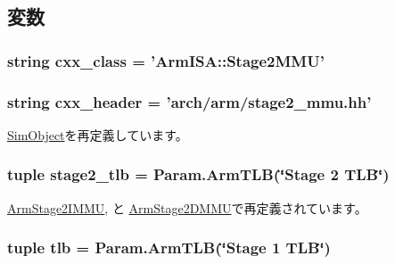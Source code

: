 \subsection{変数}
\hypertarget{classArmTLB_1_1ArmStage2MMU_a58cd55cd4023648e138237cfc0822ae3}{
\subsubsection[{cxx\_\-class}]{\setlength{\rightskip}{0pt plus 5cm}string {\bf cxx\_\-class} = '{\bf ArmISA::Stage2MMU}'}}
\label{classArmTLB_1_1ArmStage2MMU_a58cd55cd4023648e138237cfc0822ae3}
\hypertarget{classArmTLB_1_1ArmStage2MMU_a17da7064bc5c518791f0c891eff05fda}{
\subsubsection[{cxx\_\-header}]{\setlength{\rightskip}{0pt plus 5cm}string {\bf cxx\_\-header} = 'arch/arm/stage2\_\-mmu.hh'}}
\label{classArmTLB_1_1ArmStage2MMU_a17da7064bc5c518791f0c891eff05fda}


\hyperlink{classm5_1_1SimObject_1_1SimObject_a17da7064bc5c518791f0c891eff05fda}{SimObject}を再定義しています。\hypertarget{classArmTLB_1_1ArmStage2MMU_a9909fd406bc2a10a29e8593c7fccf8b4}{
\subsubsection[{stage2\_\-tlb}]{\setlength{\rightskip}{0pt plus 5cm}tuple {\bf stage2\_\-tlb} = Param.ArmTLB(\char`\"{}Stage 2 TLB\char`\"{})}}
\label{classArmTLB_1_1ArmStage2MMU_a9909fd406bc2a10a29e8593c7fccf8b4}


\hyperlink{classArmTLB_1_1ArmStage2IMMU_a9909fd406bc2a10a29e8593c7fccf8b4}{ArmStage2IMMU}, と \hyperlink{classArmTLB_1_1ArmStage2DMMU_a9909fd406bc2a10a29e8593c7fccf8b4}{ArmStage2DMMU}で再定義されています。\hypertarget{classArmTLB_1_1ArmStage2MMU_abccbff0f41ec90da875f4c4782845f8c}{
\subsubsection[{tlb}]{\setlength{\rightskip}{0pt plus 5cm}tuple {\bf tlb} = Param.ArmTLB(\char`\"{}Stage 1 TLB\char`\"{})}}
\label{classArmTLB_1_1ArmStage2MMU_abccbff0f41ec90da875f4c4782845f8c}


